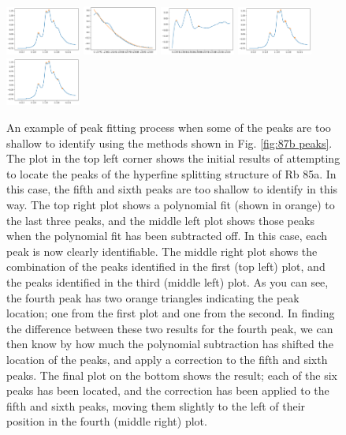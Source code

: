 \documentclass[twocolumn,amsmath,amssymb,pra, floatfix]{revtex4-2}
\begin{document}
\begin{figure}
    \centering
    \includegraphics[width=0.22\textwidth]{figures/85a_missing.pdf}
    \includegraphics[width=0.22\textwidth]{figures/85a_polyfit.pdf}
    \includegraphics[width=0.22\textwidth]{figures/85a_polyfit_peaks.pdf}
    \includegraphics[width=0.22\textwidth]{figures/85a_allpeaks.pdf}
    \includegraphics[width=0.22\textwidth]{figures/85a_finalpeaks.pdf}
    \caption{An example of peak fitting process when some of the peaks are too shallow to identify using the methods shown in Fig. \ref{fig:87b peaks}. The plot in the top left corner shows the initial results of attempting to locate the peaks of the hyperfine splitting structure of Rb 85a. In this case, the fifth and sixth peaks are too shallow to identify in this way. The top right plot shows a polynomial fit (shown in orange) to the last three peaks, and the middle left plot shows those peaks when the polynomial fit has been subtracted off. In this case, each peak is now clearly identifiable. The middle right plot shows the combination of the peaks identified in the first (top left) plot, and the peaks identified in the third (middle left) plot. As you can see, the fourth peak has two orange triangles indicating the peak location; one from the first plot and one from the second. In finding the difference between these two results for the fourth peak, we can then know by how much the polynomial subtraction has shifted the location of the peaks, and apply a correction to the fifth and sixth peaks. The final plot on the bottom shows the result; each of the six peaks has been located, and the correction has been applied to the fifth and sixth peaks, moving them slightly to the left of their position in the fourth (middle right) plot.}
    \label{fig:peak fitting}
\end{figure}
\end{document}
